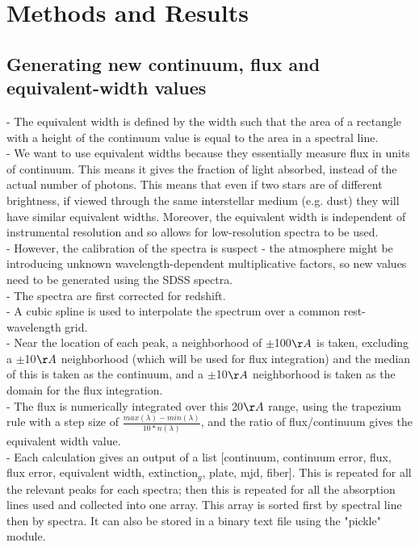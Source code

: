 \documentclass[preprint]{aastex}
\begin{document}
\section{Methods and Results}
\subsection{Generating new continuum, flux and equivalent-width values}
- The equivalent width is defined by the width such that the area of a rectangle with a height of the continuum value is equal to the area in a spectral line.\\
- We want to use equivalent widths because they essentially measure flux in units of continuum. This means it gives the fraction of light absorbed, instead of the actual number of photons. This means that even if two stars are of different brightness, if viewed through the same interstellar medium (e.g. dust) they will have similar equivalent widths. Moreover, the equivalent width is independent of instrumental resolution and so allows for low-resolution spectra to be used.\\
- However, the calibration of the spectra is suspect - the atmosphere might be introducing unknown wavelength-dependent multiplicative factors, so new values need to be generated using the SDSS spectra.\\
- The spectra are first corrected for redshift.\\
- A cubic spline is used to interpolate the spectrum over a common rest-wavelength grid.\\
- Near the location of each peak, a neighborhood of $\pm$100$\AA$ is taken, excluding a $\pm$10$\AA$ neighborhood (which will be used for flux integration) and the median of this is taken as the continuum, and a $\pm$10$\AA$ neighborhood is taken as the domain for the flux integration.\\
- The flux is numerically integrated over this 20$\AA$ range, using the trapezium rule with a step size of  $\frac{max(\lambda)-min(\lambda)}{10*n(\lambda)}$, and the ratio of flux/continuum gives the equivalent width value.\\
- Each calculation gives an output of a list [continuum, continuum error, flux, flux error, equivalent width, extinction$_g$, plate, mjd, fiber]. This is repeated for all the relevant peaks for each spectra; then this is repeated for all the absorption lines used and collected into one array. This array is sorted first by spectral line then by spectra. It can also be stored in a binary text file using the "pickle" module. \\
\end{document}
